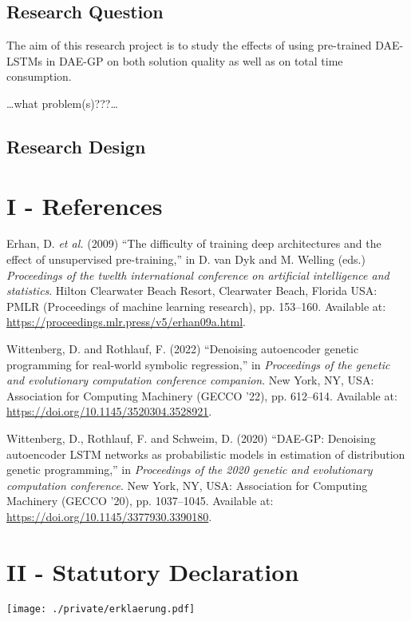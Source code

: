 \documentclass[
  12pt,
]{article}
\newlength{\cslhangindent}
\newlength{\cslentryspacingunit} %
\newenvironment{CSLReferences}[2] %
 {%
  \setlength{\parindent}{0pt}
  \ifodd #1
  \let\oldpar\par
  \def\par{\hangindent=\cslhangindent\oldpar}
  \fi
  \setlength{\parskip}{#2\cslentryspacingunit}
 }%
 {}
\begin{document}
\hypertarget{research-question}{%
\subsection{Research Question}\label{research-question}}

The aim of this research project is to study the effects of using
pre-trained DAE-LSTMs in DAE-GP on both solution quality as well as on
total time consumption.

\ldots what problem(s)???\ldots{}

\hypertarget{research-design}{%
\subsection{Research Design}\label{research-design}}

\newpage

\hypertarget{I}{%
\section*{I - References}\label{I}}

\hypertarget{refs}{}
\begin{CSLReferences}{0}{0}
\leavevmode{}%
Erhan, D. \emph{et al.} (2009) {``The difficulty of training deep
architectures and the effect of unsupervised pre-training,''} in D. van
Dyk and M. Welling (eds.) \emph{Proceedings of the twelth international
conference on artificial intelligence and statistics}. Hilton Clearwater
Beach Resort, Clearwater Beach, Florida USA: PMLR (Proceedings of
machine learning research), pp. 153--160. Available at:
\url{https://proceedings.mlr.press/v5/erhan09a.html}.

\leavevmode{}%
Wittenberg, D. and Rothlauf, F. (2022) {``Denoising autoencoder genetic
programming for real-world symbolic regression,''} in \emph{Proceedings
of the genetic and evolutionary computation conference companion}. New
York, NY, USA: Association for Computing Machinery (GECCO '22), pp.
612--614. Available at: \url{https://doi.org/10.1145/3520304.3528921}.

\leavevmode{}%
Wittenberg, D., Rothlauf, F. and Schweim, D. (2020) {``DAE-GP: Denoising
autoencoder LSTM networks as probabilistic models in estimation of
distribution genetic programming,''} in \emph{Proceedings of the 2020
genetic and evolutionary computation conference}. New York, NY, USA:
Association for Computing Machinery (GECCO '20), pp. 1037--1045.
Available at: \url{https://doi.org/10.1145/3377930.3390180}.

\end{CSLReferences}

\hypertarget{II}{%
\section*{II - Statutory Declaration}\label{II}}

\texttt{[image: ./private/erklaerung.pdf]}\\
\end{document}
